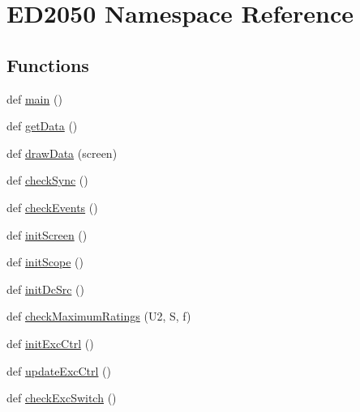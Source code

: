 \hypertarget{namespaceED2050}{}\section{E\+D2050 Namespace Reference}
\label{namespaceED2050}
\subsection*{Functions}
\begin{DoxyCompactItemize}
\item 
def \hyperlink{namespaceED2050_a27554b34bcc2a830b18d75fa02939bc7}{main} ()
\item 
def \hyperlink{namespaceED2050_ab751c672fcc67e06faadcc7d0ba32951}{get\+Data} ()
\item 
def \hyperlink{namespaceED2050_ae549372de5246cb01c9d854b836da86d}{draw\+Data} (screen)
\item 
def \hyperlink{namespaceED2050_a9e2f75b5080651a861371e2c60643309}{check\+Sync} ()
\item 
def \hyperlink{namespaceED2050_a5310c7dde66183f64bc856c9fdc3f17a}{check\+Events} ()
\item 
def \hyperlink{namespaceED2050_aafd6a3a6c52b44017db2d0cc7d608e5d}{init\+Screen} ()
\item 
def \hyperlink{namespaceED2050_a348653b636181ae8ffcddc1577b44397}{init\+Scope} ()
\item 
def \hyperlink{namespaceED2050_ab9da13b2f573c582bd96cbb271f0be50}{init\+Dc\+Src} ()
\item 
def \hyperlink{namespaceED2050_ac340134ae43a853d32558cec034035ee}{check\+Maximum\+Ratings} (U2, S, f)
\item 
def \hyperlink{namespaceED2050_a07cbbb54c003e04ab8ba03bee8b3a545}{init\+Exc\+Ctrl} ()
\item 
def \hyperlink{namespaceED2050_a4331a4fa9979e638e9caca79e314eb85}{update\+Exc\+Ctrl} ()
\item 
def \hyperlink{namespaceED2050_af7a9f53151313470ed08a3a67e8b05e6}{check\+Exc\+Switch} ()
\end{DoxyCompactItemize}
